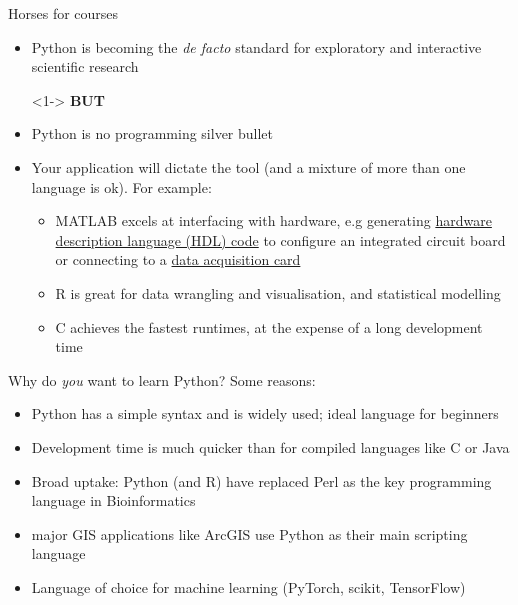 \documentclass[xcolor=table]{beamer}
\begin{document}
\begin{frame}{Horses for courses}

\begin{itemize}\addtolength{\itemsep}{0.5\baselineskip}
        \item<1-> Python is becoming the \emph{de facto} standard for exploratory and interactive scientific research\\
	\item[]<1-> \textbf{BUT}
	\item<2-> Python is no programming silver bullet
	\item<3-> Your application will dictate the tool (and a mixture of more than one language is ok). For example:\\
	\begin{itemize}\addtolength{\itemsep}{0.8\baselineskip}
		\item<4-> MATLAB excels at interfacing with hardware, e.g generating \href{https://uk.mathworks.com/products/hdl-coder.html}{hardware description language (HDL) code} to configure an integrated circuit board or connecting to a \href{https://uk.mathworks.com/products/daq.html}{data acquisition card}
		\item<5-> R is great for data wrangling and visualisation, and statistical modelling
        \item<6-> C achieves the fastest runtimes, at the expense of a long development time
	\end{itemize}
\end{itemize}

\end{frame}


\begin{frame}{Why do \textit{you} want to learn Python?}
    Some reasons:
    \pause
    \begin{itemize}
        \item Python has a simple syntax and is widely used; ideal language for beginners
            \pause
        \item Development time is much quicker than for compiled languages like C or Java
            \pause
        \item Broad uptake: Python (and R) have replaced Perl as the key programming language in Bioinformatics
            \pause
        \item major GIS applications like ArcGIS use Python as their main scripting language
        \item Language of choice for machine learning (PyTorch, scikit, TensorFlow)
            \pause
    \end{itemize}
\end{frame}
\end{document}
